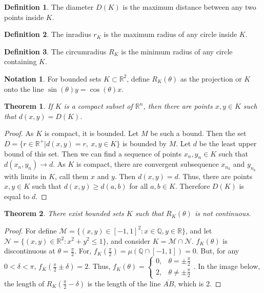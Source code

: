 \documentclass[oneside]{book}
\newtheorem{theorem}{Theorem}[section]
\theoremstyle{definition}
\newtheorem{definition}{Definition}[section]
\newtheorem{notation}{Notation}[section]
\begin{document}
\begin{definition}
The diameter $D(K)$ is the maximum distance between any two points inside $K$.
\end{definition}

\begin{definition}
The inradius $r_K$ is the maximum radius of any circle inside $K$.
\end{definition}

\begin{definition}
The circumradius $R_K$ is the minimum radius of any circle containing $K$.
\end{definition}

\begin{notation}
For bounded sets $K\subset \mathbb{R}^2$, define $R_K(\theta)$ as the projection or $K$ onto the line $\sin(\theta)y=\cos(\theta)x$.
\end{notation}

\begin{theorem}
If $K$ is a compact subset of $\mathbb{R}^n$, then there are points $x,y\in K$ such that $d(x,y)=D(K)$.
\end{theorem}
\begin{proof}
As $K$ is compact, it is bounded. Let $M$ be such a bound. Then the set $D=\{r\in \mathbb{R}^+| d(x,y) = r,\ x,y\in K\}$ is bounded by $M$. Let $d$ be the least upper bound of this set. Then we can find a sequence of points $x_n,y_n\in K$ such that $d(x_n,y_n) \rightarrow d$. As $K$ is compact, there are convergent subsequence $x_{n_k}$ and $y_{n_k}$ with limits in $K$, call them $x$ and $y$. Then $d(x,y) = d$. Thus, there are points $x,y\in K$ such that $d(x,y) \geq d(a,b)$ for all $a,b\in K$. Therefore $D(K)$ is equal to $d$.
\end{proof}

\begin{theorem}
There exist bounded sets $K$ such that $R_K(\theta)$ is not continuous.
\end{theorem}
\begin{proof}
For define $\mathcal{M} = \{(x,y)\in [-1,1]^2: x\in \mathbb{Q},y\in \mathbb{R}\}$, and let $\mathcal{N} = \{(x,y)\in \mathbb{R}^2: x^2+y^2\leq 1\}$, and consider $K = \mathcal{M}\cap \mathcal{N}$. $f_{K}(\theta)$ is discontinuous at $\theta = \frac{\pi}{2}$. For, $f_K(\frac{\pi}{2}) = \mu(\mathbb{Q}\cap [-1,1])=0$. But, for any $0<\delta < \pi$, $f_K(\frac{\pi}{2}\pm\delta) = 2$. Thus, $f_K(\theta) = \begin{cases} 0, & \theta = \pm \frac{\pi}{2} \\ 2, & \theta \ne \pm \frac{\pi}{2}\end{cases}$. In the image below, the length of $R_K(\frac{\pi}{2}-\delta)$ is the length of the line $\overline{AB}$, which is 2.
\end{proof}
\end{document}
